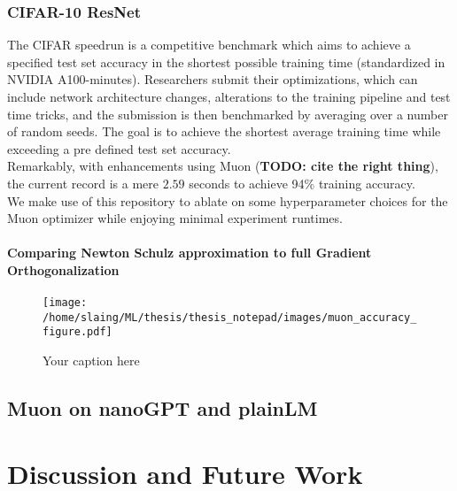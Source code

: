 \documentclass[12pt]{book}
\newcommand{\todo}[1]{{\color{red}\bf{TODO: #1}}}
\begin{document}
\subsection{CIFAR-10 ResNet}
The CIFAR speedrun is a competitive benchmark which aims to achieve a specified test set accuracy in the shortest possible training time (standardized in NVIDIA A100-minutes). Researchers submit their optimizations, which can include network architecture changes, alterations to the training pipeline and test time tricks, and the submission is then benchmarked by averaging over a number of random seeds. The goal is to achieve the shortest average training time while exceeding a pre defined test set accuracy. \\
Remarkably, with enhancements using Muon (\todo{cite the right thing}), the current record is a mere $2.59$ seconds to achieve 94\% training accuracy. 
\\
We make use of this repository to ablate on some hyperparameter choices for the Muon optimizer while enjoying minimal experiment runtimes. 
\\
\subsubsection*{Comparing Newton Schulz approximation to full Gradient Orthogonalization}

\begin{figure}[htbp]
  \centering
  \texttt{[image: /home/slaing/ML/thesis/thesis\_notepad/images/muon\_accuracy\_figure.pdf]}
  \caption{Your caption here}
  \label{fig:muon_accuracy}
\end{figure}

\section{Muon on nanoGPT and plainLM} 
\chapter{Discussion and Future Work}


\end{document}
